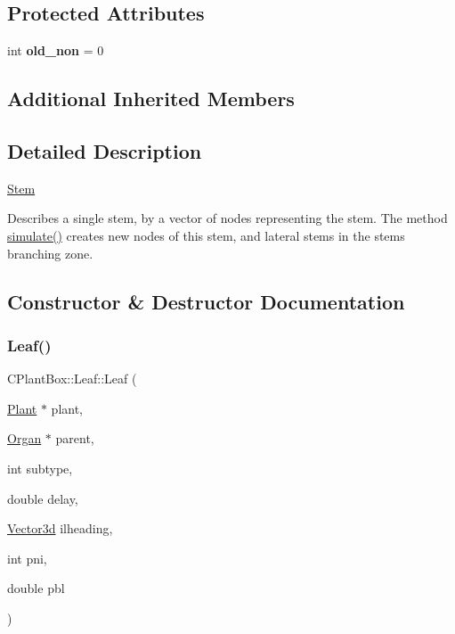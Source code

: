 \subsection*{Protected Attributes}
\begin{DoxyCompactItemize}
\item 
\mbox{\label{classCPlantBox_1_1Leaf_af1b6f6f42d3aa45710141e7f47124e6e}} 
int {\bfseries old\+\_\+non} = 0
\end{DoxyCompactItemize}
\subsection*{Additional Inherited Members}


\subsection{Detailed Description}
\hyperlink{classCPlantBox_1_1Stem}{Stem}

Describes a single stem, by a vector of nodes representing the stem. The method \hyperlink{classCPlantBox_1_1Leaf_ac8f35a92020107f44059b995e44af5d6}{simulate()} creates new nodes of this stem, and lateral stems in the stem\textquotesingle{}s branching zone. 

\subsection{Constructor \& Destructor Documentation}
\mbox{\label{classCPlantBox_1_1Leaf_a00707cb127c0c09df6b63a5be0d3a35e}} 
\subsubsection{\texorpdfstring{Leaf()}{Leaf()}}
{\footnotesize\ttfamily C\+Plant\+Box\+::\+Leaf\+::\+Leaf (\begin{DoxyParamCaption}\item[{\hyperlink{classCPlantBox_1_1Plant}{Plant} $\ast$}]{plant,  }\item[{\hyperlink{classCPlantBox_1_1Organ}{Organ} $\ast$}]{parent,  }\item[{int}]{subtype,  }\item[{double}]{delay,  }\item[{\hyperlink{classCPlantBox_1_1Vector3d}{Vector3d}}]{ilheading,  }\item[{int}]{pni,  }\item[{double}]{pbl }\end{DoxyParamCaption})}



